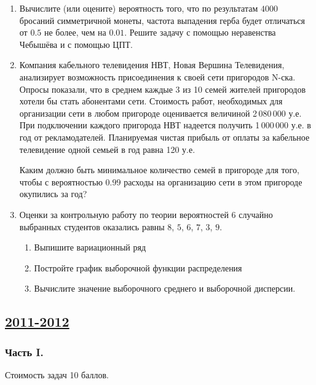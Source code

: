 \begin{enumerate}
\item Вычислите (или оцените) вероятность того, что по результатам $4000$ бросаний
симметричной монеты, частота выпадения герба будет отличаться от $0.5$ не более,
чем на $0.01$. Решите задачу с помощью неравенства Чебышёва и с помощью ЦПТ.

\item Компания кабельного телевидения НВТ, Новая Вершина Телевидения, анализирует
возможность присоединения к своей сети пригородов N-ска. Опросы показали, что в
среднем каждые 3 из 10 семей жителей пригородов хотели бы стать абонентами сети.
Стоимость работ, необходимых для организации сети в любом пригороде оценивается
величиной 2\,080\,000 у.е. При подключении каждого пригорода НВТ надеется получить
1\,000\,000 у.е. в год от рекламодателей. Планируемая чистая прибыль от оплаты за
кабельное телевидение одной семьей в год равна 120 у.е.

Каким должно быть минимальное количество семей в пригороде для того, чтобы
с вероятностью $0.99$ расходы на организацию сети в этом пригороде окупились за год?

\item Оценки за контрольную работу по теории вероятностей 6 случайно выбранных
студентов оказались равны $8$, $5$, $6$, $7$, $3$, $9$.

\begin{enumerate}
\item Выпишите вариационный ряд
\item Постройте график выборочной функции распределения
\item Вычислите значение выборочного среднего и выборочной дисперсии.
\end{enumerate}
\end{enumerate}



\newpage
\subsection[2011-2012]{\hyperref[sec:sol_kr_02_2011_2012]{2011-2012}}
\label{sec:kr_02_2011_2012}

\subsubsection*{Часть I.}
Стоимость задач 10 баллов.


